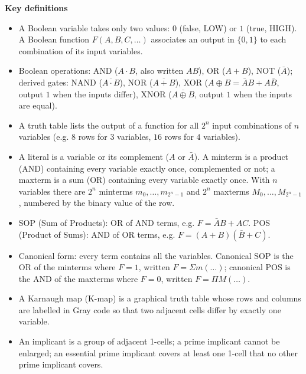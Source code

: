 \documentclass[11pt]{article}
\newcommand{\cle}[1]{{\popxbold\color{popdark}#1}}
\begin{document}
\begin{bilan}
\textbf{Key definitions}
\begin{itemize}
\item A \cle{Boolean variable} takes only two values: $0$ (false, LOW) or $1$ (true, HIGH). A \cle{Boolean function} $F(A,B,C,\dots)$ associates an output in $\{0,1\}$ to each combination of its input variables.
\item \cle{Boolean operations}: AND ($A\cdot B$, also written $AB$), OR ($A+B$), NOT ($\bar{A}$); derived gates: NAND ($\overline{A\cdot B}$), NOR ($\overline{A+B}$), XOR ($A\oplus B = \bar{A}B + A\bar{B}$, output $1$ when the inputs differ), XNOR ($\overline{A\oplus B}$, output $1$ when the inputs are equal).
\item A \cle{truth table} lists the output of a function for all $2^n$ input combinations of $n$ variables (e.g. $8$ rows for $3$ variables, $16$ rows for $4$ variables).
\item A \cle{literal} is a variable or its complement ($A$ or $\bar{A}$). A \cle{minterm} is a product (AND) containing every variable exactly once, complemented or not; a \cle{maxterm} is a sum (OR) containing every variable exactly once. With $n$ variables there are $2^n$ minterms $m_0,\dots,m_{2^n-1}$ and $2^n$ maxterms $M_0,\dots,M_{2^n-1}$, numbered by the binary value of the row.
\item \cle{SOP} (Sum of Products): OR of AND terms, e.g. $F=\bar{A}B+AC$. \cle{POS} (Product of Sums): AND of OR terms, e.g. $F=(A+B)(\bar{B}+C)$.
\item \cle{Canonical form}: every term contains all the variables. Canonical SOP is the OR of the minterms where $F=1$, written $F=\Sigma m(\dots)$; canonical POS is the AND of the maxterms where $F=0$, written $F=\Pi M(\dots)$.
\item A \cle{Karnaugh map} (K-map) is a graphical truth table whose rows and columns are labelled in \cle{Gray code} so that two adjacent cells differ by exactly one variable.
\item An \cle{implicant} is a group of adjacent 1-cells; a \cle{prime implicant} cannot be enlarged; an \cle{essential prime implicant} covers at least one 1-cell that no other prime implicant covers.
\end{itemize}


\end{bilan}
\end{document}
